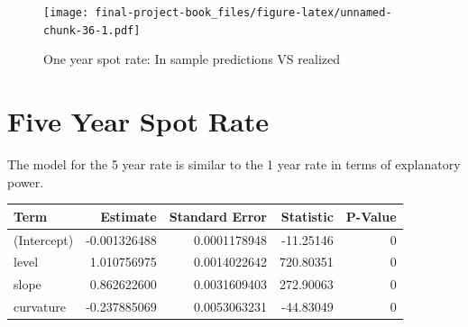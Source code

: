 \documentclass[]{book}
\newenvironment{Shaded}{\begin{snugshade}}{\end{snugshade}}
\newcommand{\ControlFlowTok}[1]{\textcolor[rgb]{0.13,0.29,0.53}{\textbf{#1}}}
\newcommand{\DataTypeTok}[1]{\textcolor[rgb]{0.13,0.29,0.53}{#1}}
\newcommand{\KeywordTok}[1]{\textcolor[rgb]{0.13,0.29,0.53}{\textbf{#1}}}
\newcommand{\NormalTok}[1]{#1}
\newcommand{\OperatorTok}[1]{\textcolor[rgb]{0.81,0.36,0.00}{\textbf{#1}}}
\newcommand{\StringTok}[1]{\textcolor[rgb]{0.31,0.60,0.02}{#1}}
\theoremstyle{definition}
\theoremstyle{definition}
\theoremstyle{definition}
\theoremstyle{remark}
\begin{document}
\begin{Shaded}
\end{Shaded}

\begin{figure}
\centering
\texttt{[image: final-project-book\_files/figure-latex/unnamed-chunk-36-1.pdf]}
\caption{\label{fig:unnamed-chunk-36}One year spot rate: In sample
predictions VS realized}
\end{figure}

\hypertarget{five-year-spot-rate}{%
\section{Five Year Spot Rate}\label{five-year-spot-rate}}

The model for the 5 year rate is similar to the 1 year rate in terms of
explanatory power.

\begin{tabular}{l|r|r|r|r}
\hline
Term & Estimate & Standard Error & Statistic & P-Value\\
\hline
(Intercept) & -0.001326488 & 0.0001178948 & -11.25146 & 0\\
\hline
level & 1.010756975 & 0.0014022642 & 720.80351 & 0\\
\hline
slope & 0.862622600 & 0.0031609403 & 272.90063 & 0\\
\hline
curvature & -0.237885069 & 0.0053063231 & -44.83049 & 0\\
\hline
\end{tabular}
\end{document}
